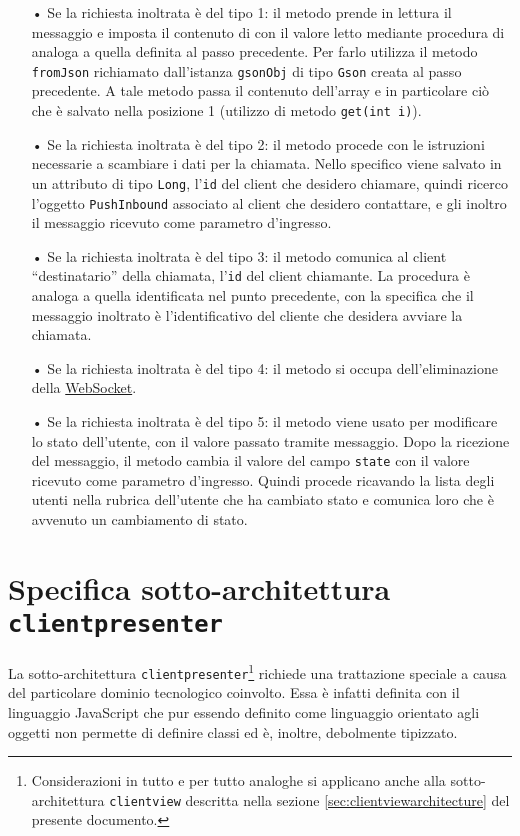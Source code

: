 \begin{description}
	\begin{itemize}
		\item[•]Se la richiesta inoltrata è del tipo 1: il metodo prende in lettura il messaggio e imposta il contenuto di  con il valore letto mediante procedura di  analoga a quella definita al passo precedente. Per farlo utilizza il metodo \texttt{fromJson} richiamato dall'istanza \texttt{gsonObj} di tipo \texttt{Gson} creata al passo precedente. A tale metodo passa il contenuto dell'array e in particolare ciò che è salvato nella posizione 1 (utilizzo di metodo \texttt{get(int i)}).
		\item[•]Se la richiesta inoltrata è del tipo 2: il metodo procede con le istruzioni necessarie a scambiare i dati per la chiamata. Nello specifico viene salvato in un attributo di tipo \texttt{Long}, l'\texttt{id} del client che desidero chiamare, quindi ricerco l'oggetto \texttt{PushInbound} associato al client che desidero contattare, e gli inoltro il messaggio ricevuto come parametro d'ingresso.
		\item[•]Se la richiesta inoltrata è del tipo 3: il metodo comunica al client ``destinatario'' della chiamata, l'\texttt{id} del client chiamante. La procedura è analoga a quella identificata nel punto precedente, con la specifica che il messaggio inoltrato è l'identificativo del cliente che desidera avviare la chiamata.
		\item[•]Se la richiesta inoltrata è del tipo 4: il metodo si occupa dell'eliminazione della \underline{WebSocket}.
		\item[•]Se la richiesta inoltrata è del tipo 5: il metodo viene usato per modificare lo stato dell'utente, con il valore passato tramite messaggio. Dopo la ricezione del messaggio, il metodo cambia il valore del campo \texttt{state} con il valore ricevuto come parametro d'ingresso. Quindi procede ricavando la lista degli utenti nella rubrica dell'utente che ha cambiato stato e comunica loro che è avvenuto un cambiamento di stato.
	\end{itemize}
\end{description}

\clearpage

\section{Specifica sotto-architettura \texttt{clientpresenter}}\label{sec:clientpresenterarchitecture}

La sotto-architettura \texttt{clientpresenter}\footnote{%
  Considerazioni in tutto e per tutto analoghe si applicano anche alla sotto-architettura \texttt{clientview} descritta nella sezione \vref{sec:clientviewarchitecture} del presente documento.
}
richiede una trattazione speciale a causa del particolare dominio tecnologico coinvolto. Essa è infatti definita con il linguaggio JavaScript che pur essendo definito come linguaggio orientato agli oggetti non permette di definire classi ed è, inoltre, debolmente tipizzato.

